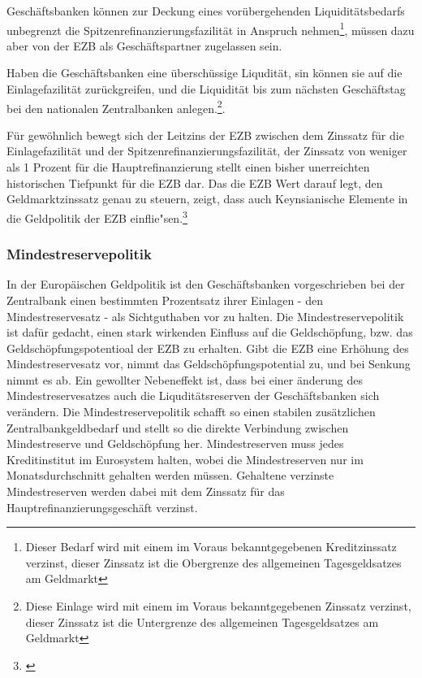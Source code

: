 \documentclass[
        onecolumn,
        a4paper,
        abstracton,
        parskip=half
        ,final
        ]{scrartcl}
\begin{document}
Gesch{\"a}ftsbanken k{\"o}nnen zur Deckung eines vor{\"u}bergehenden Liquidit{\"a}tsbedarfs unbegrenzt die Spitzenrefinanzierungsfazilit{\"a}t in Anspruch nehmen\footnote[36]{Dieser Bedarf wird mit einem im Voraus bekanntgegebenen Kreditzinssatz verzinst, dieser Zinssatz ist die Obergrenze des allgemeinen Tagesgeldsatzes am Geldmarkt}, m{\"u}ssen dazu aber von der EZB als Gesch{\"a}ftspartner zugelassen sein.

Haben die Gesch{\"a}ftsbanken eine {\"u}bersch{\"u}ssige Liqudit{\"a}t, sin k{\"o}nnen sie auf die Einlagefazilit{\"a}t zur{\"u}ckgreifen, und die Liquidit{\"a}t bis zum n{\"a}chsten Gesch{\"a}ftstag bei den nationalen Zentralbanken anlegen.\footnote[37]{Diese Einlage wird mit einem im Voraus bekanntgegebenen Zinssatz verzinst, dieser Zinssatz ist die Untergrenze des allgemeinen Tagesgeldsatzes am Geldmarkt}.

F{\"u}r gew{\"o}hnlich bewegt sich der Leitzins der EZB zwischen dem Zinssatz f{\"u}r die Einlagefazilit{\"a}t und der Spitzenrefinanzierungsfazilit{\"a}t, der Zinssatz von weniger als 1 Prozent f{\"u}r die Hauptrefinanzierung stellt einen bisher unerreichten historischen Tiefpunkt f{\"u}r die EZB dar.
Das die EZB Wert darauf legt, den Geldmarktzinssatz genau zu steuern, zeigt, dass auch Keynsianische Elemente in die Geldpolitik der EZB einflie{"s}en.\footnote[59]{\citep[vgl.][S.562f]{Basseler2010}}

\subsubsection{Mindestreservepolitik} \citep[vgl.][S.562f]{Basseler2010}
In der Europ{\"a}ischen Geldpolitik ist den Gesch{\"a}ftsbanken vorgeschrieben bei der Zentralbank einen bestimmten Prozentsatz ihrer Einlagen - den Mindestreservesatz - als Sichtguthaben vor zu halten. Die Mindestreservepolitik ist daf{\"u}r gedacht, einen stark wirkenden Einfluss auf die Geldsch{\"o}pfung, bzw. das Geldsch{\"o}pfungspotentioal der EZB zu erhalten. Gibt die EZB eine Erh{\"o}hung des Mindestreservesatz vor, nimmt das Geldsch{\"o}pfungspotential zu, und bei Senkung nimmt es ab. Ein gewollter Nebeneffekt ist, dass bei einer {\"a}nderung des Mindestreservesatzes auch die Liqudit{\"a}tsreserven der Gesch{\"a}ftsbanken sich ver{\"a}ndern.
Die Mindestreservepolitik schafft so einen stabilen zus{\"a}tzlichen Zentralbankgeldbedarf und stellt so die direkte Verbindung zwischen Mindestreserve und Geldsch{\"o}pfung her.
Mindestreserven muss jedes Kreditinstitut im Eurosystem halten, wobei die Mindestreserven nur im Monatsdurchschnitt gehalten werden m{\"u}ssen. Gehaltene verzinste Mindestreserven werden dabei mit dem Zinssatz f{\"u}r das Hauptrefinanzierungsgesch{\"a}ft verzinst.
\end{document}

